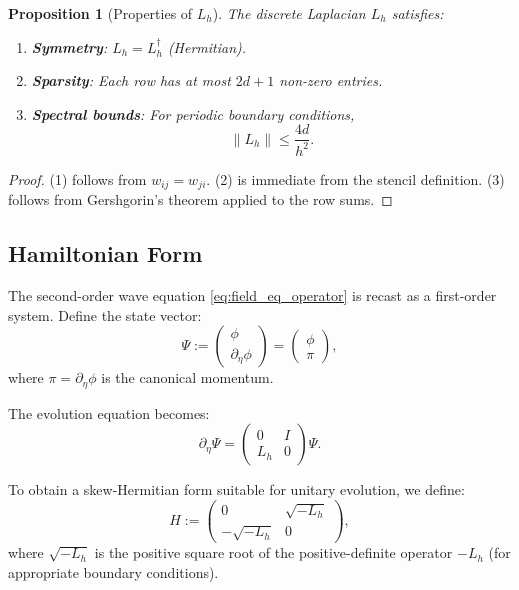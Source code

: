 \documentclass[11pt,a4paper]{article}
\newcommand{\laph}{L_h}
\theoremstyle{plain}
\newtheorem{proposition}[theorem]{Proposition}
\theoremstyle{definition}
\theoremstyle{remark}
\begin{document}
\begin{proposition}[Properties of $\laph$]\label{prop:Lh_properties}
The discrete Laplacian $\laph$ satisfies:
\begin{enumerate}
    \item \textbf{Symmetry}: $\laph = \laph^\dagger$ (Hermitian).
    \item \textbf{Sparsity}: Each row has at most $2d+1$ non-zero entries.
    \item \textbf{Spectral bounds}: For periodic boundary conditions,
    \begin{equation}
        \|\laph\| \leq \frac{4d}{h^2}.
    \end{equation}
\end{enumerate}
\end{proposition}

\begin{proof}
(1) follows from $w_{ij} = w_{ji}$. (2) is immediate from the stencil definition. (3) follows from Gershgorin's theorem applied to the row sums.
\end{proof}

\subsection{Hamiltonian Form}\label{subsec:hamiltonian_form}

The second-order wave equation \eqref{eq:field_eq_operator} is recast as a first-order system. Define the state vector:
\begin{equation}\label{eq:state_vector}
    \Psi := \begin{pmatrix} \phi \\ \partial_\eta \phi \end{pmatrix} = \begin{pmatrix} \phi \\ \pi \end{pmatrix},
\end{equation}
where $\pi = \partial_\eta \phi$ is the canonical momentum.

The evolution equation becomes:
\begin{equation}\label{eq:hamiltonian_evolution}
    \partial_\eta \Psi = \begin{pmatrix} 0 & I \\ \laph & 0 \end{pmatrix} \Psi.
\end{equation}

To obtain a skew-Hermitian form suitable for unitary evolution, we define:
\begin{equation}\label{eq:H_matrix}
    H := \begin{pmatrix} 0 & \sqrt{-\laph} \\ -\sqrt{-\laph} & 0 \end{pmatrix},
\end{equation}
where $\sqrt{-\laph}$ is the positive square root of the positive-definite operator $-\laph$ (for appropriate boundary conditions).
\end{document}
